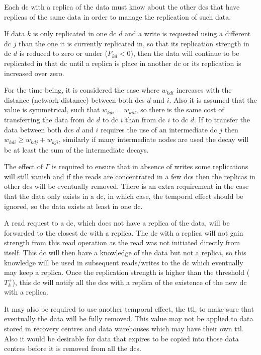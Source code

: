 \documentclass{acm_proc_article-sp}
\begin{document}
Each \gls{dc} with a replica of the data must know about the other \glspl{dc} that have replicas of the same data in order to manage the replication of such data.

If data $k$ is only replicated in one \gls{dc} $d$ and a write is requested using a different \gls{dc} $j$ than the one it is currently replicated in, so that its replication strength in \gls{dc} $d$ is reduced to zero or under ($F_{kd} < 0$), then the data will continue to be replicated in that \gls{dc} until a replica is place in another \gls{dc} or its replication is increased over zero.

For the time being, it is considered the case where $w_{kdi}$ increases with the distance (network distance) between both \glspl{dc} $d$ and $i$. Also it is assumed that the value is symmetrical, such that $w_{kdi} = w_{kid}$, so there is the same cost of transferring the data from \gls{dc} $d$ to \gls{dc} $i$ than from \gls{dc} $i$ to \gls{dc} $d$. If to transfer the data between both \glspl{dc} $d$ and $i$ requires the use of an intermediate \gls{dc} $j$ then $w_{kdi} \ge w_{kdj} + w_{kji}$, similarly if many intermediate nodes are used the decay will be at least the sum of the intermediate decays.

The effect of $\Gamma$ is required to ensure that in absence of writes some replications will still vanish and if the reads are concentrated in a few \glspl{dc} then the replicas in other \glspl{dc} will be eventually removed. There is an extra requirement in the case that the data only exists in a \gls{dc}, in which case, the temporal effect should be ignored, so the data exists at least in one \gls{dc}.

A read request to a \gls{dc}, which does not have a replica of the data, will be forwarded to the closest \gls{dc} with a replica. The \gls{dc} with a replica will not gain strength from this read operation as the read was not initiated directly from itself. This \gls{dc} will then have a knowledge of the data but not a replica, so this knowledge will be used in subsequent reads/writes to the \gls{dc} which eventually may keep a replica. Once the replication strength is higher than the threshold ($T^{+}_{k}$), this \gls{dc} will notify all the \glspl{dc} with a replica of the existence of the new \gls{dc} with a replica.

It may also be required to use another temporal effect, the \gls{ttl}, to make sure that eventually the data will be fully removed. This value may not be applied to data stored in recovery centres and data warehouses which may have their own \gls{ttl}. Also it would be desirable for data that expires to be copied into those data centres before it is removed from all the \glspl{dc}.
\end{document}
